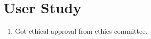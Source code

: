 \section{User Study}
\begin{enumerate}
	\item Got ethical approval from ethics committee. 
\end{enumerate}
